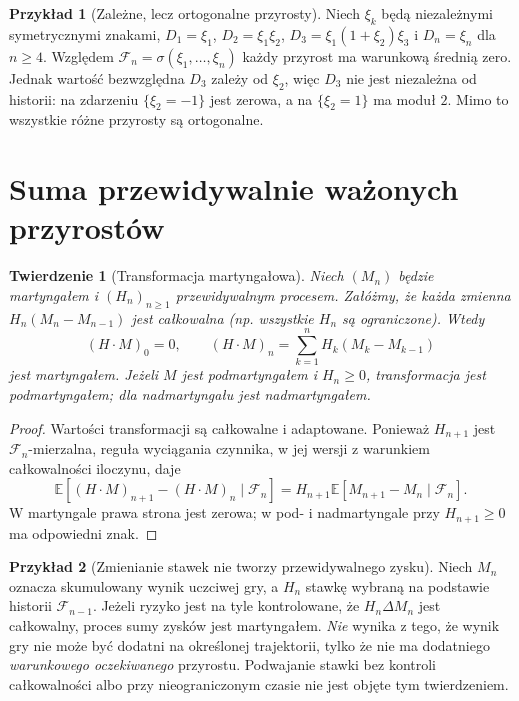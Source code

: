\documentclass[11pt,a4paper,oneside]{report}
\numberwithin{equation}{chapter}
\theoremstyle{plain}
\newtheorem{twierdzenie}{Twierdzenie}[chapter]
\theoremstyle{definition}
\newtheorem{przyklad}{Przykład}[chapter]
\theoremstyle{remark}
\newcommand{\E}{\mathbb{E}}
\begin{document}
\begin{przyklad}[Zależne, lecz ortogonalne przyrosty]
Niech $\xi_k$ będą niezależnymi symetrycznymi
znakami, $D_1=\xi_1$, $D_2=\xi_1\xi_2$,
$D_3=\xi_1(1+\xi_2)\xi_3$ i
$D_n=\xi_n$ dla $n\geq4$.
Względem $\mathcal F_n=\sigma(\xi_1,\ldots,\xi_n)$
każdy przyrost ma warunkową średnią zero.
Jednak wartość bezwzględna $D_3$ zależy od
$\xi_2$, więc $D_3$ nie jest niezależna od
historii: na zdarzeniu $\{\xi_2=-1\}$ jest zerowa,
a na $\{\xi_2=1\}$ ma moduł $2$.
Mimo to wszystkie różne przyrosty są ortogonalne.
\end{przyklad}

\section{Suma przewidywalnie ważonych przyrostów}

\begin{twierdzenie}[Transformacja martyngałowa]
Niech $(M_n)$ będzie martyngałem i
$(H_n)_{n\geq1}$ przewidywalnym procesem.
Załóżmy, że każda zmienna
$H_n(M_n-M_{n-1})$ jest całkowalna
(np. wszystkie $H_n$ są ograniczone).
Wtedy
\[
(H\cdot M)_0=0,\qquad
(H\cdot M)_n=\sum_{k=1}^nH_k(M_k-M_{k-1})
\]
jest martyngałem. Jeżeli $M$ jest
podmartyngałem i $H_n\geq0$, transformacja
jest podmartyngałem; dla nadmartyngału
jest nadmartyngałem.
\end{twierdzenie}
\begin{proof}
Wartości transformacji są całkowalne i adaptowane.
Ponieważ $H_{n+1}$ jest $\mathcal F_n$-mierzalna,
reguła wyciągania czynnika, w jej wersji
z warunkiem całkowalności iloczynu, daje
\[
\E[(H\cdot M)_{n+1}-(H\cdot M)_n
\mid\mathcal F_n]
=H_{n+1}\E[M_{n+1}-M_n\mid\mathcal F_n].
\]
W martyngale prawa strona jest zerowa; w
pod- i nadmartyngale przy $H_{n+1}\geq0$
ma odpowiedni znak.
\end{proof}

\begin{przyklad}[Zmienianie stawek nie tworzy przewidywalnego zysku]
Niech $M_n$ oznacza skumulowany wynik uczciwej gry,
a $H_n$ stawkę wybraną na podstawie historii
$\mathcal F_{n-1}$. Jeżeli ryzyko jest na tyle
kontrolowane, że $H_n\Delta M_n$ jest całkowalny,
proces sumy zysków jest martyngałem.
\emph{Nie} wynika z tego, że wynik gry nie może
być dodatni na określonej trajektorii, tylko że
nie ma dodatniego \emph{warunkowego oczekiwanego}
przyrostu. Podwajanie stawki bez kontroli
całkowalności albo przy nieograniczonym czasie
nie jest objęte tym twierdzeniem.
\end{przyklad}
\end{document}
